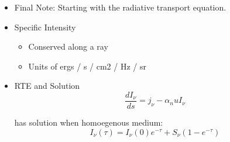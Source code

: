 \documentclass{article}
\begin{document}
\begin{itemize}
    \item Final Note: Starting with the radiative transport equation.
\end{itemize}

\begin{itemize}
    \item Specific Intensity
    \begin{itemize}
        \item Conserved along a ray
        \item Units of ergs / s / cm2 / Hz / sr
    \end{itemize}
    \item RTE and Solution
    $$
    \frac{dI_\nu}{ds} = j_\nu - \alpha_nu I_\nu
    $$
    
    has solution when homoegenous medium: 
    $$
    I_\nu(\tau) = I_\nu(0) e^{-\tau} + S_\nu (1 - e^{-\tau})
    $$
    

\end{itemize}
\end{document}
